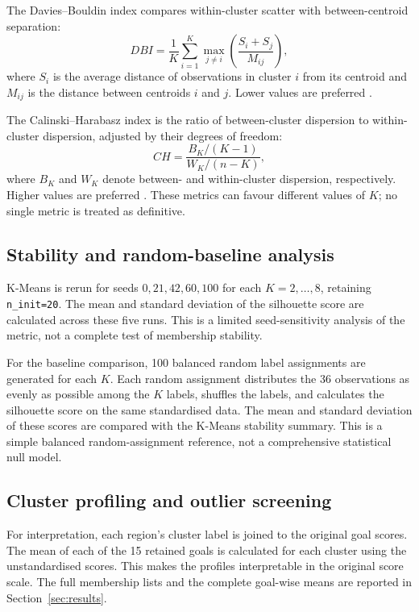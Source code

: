 \documentclass[11pt,a4paper]{article}
\begin{document}
The Davies--Bouldin index compares within-cluster scatter with between-centroid separation:
\begin{equation}
DBI=\frac{1}{K}\sum_{i=1}^{K}\max_{j\ne i}
\left(\frac{S_i+S_j}{M_{ij}}\right),
\label{eq:db}
\end{equation}
where $S_i$ is the average distance of observations in cluster $i$ from its centroid and $M_{ij}$ is the distance between centroids $i$ and $j$. Lower values are preferred \cite{davies1979}.

The Calinski--Harabasz index is the ratio of between-cluster dispersion to within-cluster dispersion, adjusted by their degrees of freedom:
\begin{equation}
CH=\frac{B_K/(K-1)}{W_K/(n-K)},
\label{eq:ch}
\end{equation}
where $B_K$ and $W_K$ denote between- and within-cluster dispersion, respectively. Higher values are preferred \cite{calinski1974}. These metrics can favour different values of $K$; no single metric is treated as definitive.

\subsection{Stability and random-baseline analysis}
K-Means is rerun for seeds $0,21,42,60,100$ for each $K=2,\ldots,8$, retaining \texttt{n\_init=20}. The mean and standard deviation of the silhouette score are calculated across these five runs. This is a limited seed-sensitivity analysis of the metric, not a complete test of membership stability.

For the baseline comparison, 100 balanced random label assignments are generated for each $K$. Each random assignment distributes the 36 observations as evenly as possible among the $K$ labels, shuffles the labels, and calculates the silhouette score on the same standardised data. The mean and standard deviation of these scores are compared with the K-Means stability summary. This is a simple balanced random-assignment reference, not a comprehensive statistical null model.

\subsection{Cluster profiling and outlier screening}
For interpretation, each region's cluster label is joined to the original goal scores. The mean of each of the 15 retained goals is calculated for each cluster using the unstandardised scores. This makes the profiles interpretable in the original score scale. The full membership lists and the complete goal-wise means are reported in Section~\ref{sec:results}.
\end{document}
